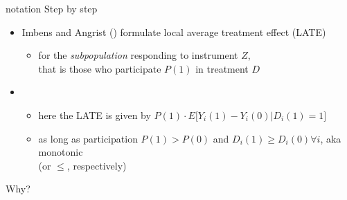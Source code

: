 \documentclass[aspectratio=169]{beamer}
\begin{document}
		\begin{frame}{notation}
			Step by step \\ \vspace*{.25cm}
			\begin{itemize}
				\item<1-> Imbens and Angrist (\citeyear{Imbens1994}) formulate local average treatment effect (LATE)
				\begin{itemize}
					\item<1-> for the \textit{subpopulation} responding to instrument $Z$, \\ that is those who participate $P(1)$ in treatment $D$
				\end{itemize}
			\end{itemize}
			\vspace*{.25cm}
			\begin{itemize}
				\item []
				\begin{itemize}
					\item<3-> here the LATE is given by $P(1) \cdot E \lbrack Y_i(1) - Y_i(0)|D_i(1) = 1 \rbrack $
					\item<4-> as long as participation $P(1)>P(0)$ and $D_i(1) \geq D_i(0) \forall i$, aka monotonic \\ (or $\leq$, respectively)
				\end{itemize}
			\end{itemize}
			\vspace*{.25cm}
			Why? %
		\end{frame}
\end{document}
